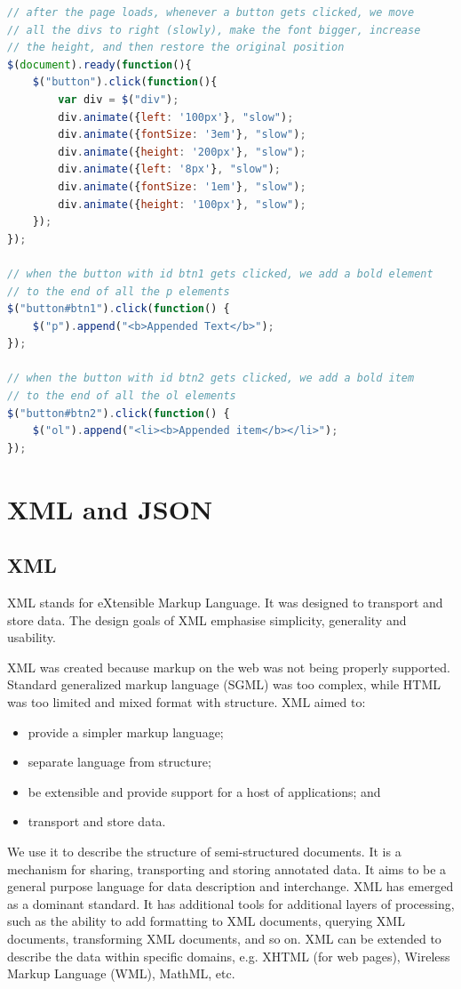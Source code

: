 \documentclass[a4paper, openany]{memoir}
\begin{document}
\begin{lstlisting}[language=javascript]
// after the page loads, whenever a button gets clicked, we move
// all the divs to right (slowly), make the font bigger, increase 
// the height, and then restore the original position
$(document).ready(function(){	
	$("button").click(function(){	
		var	div	= $("div");			
		div.animate({left: '100px'}, "slow");	
		div.animate({fontSize: '3em'}, "slow");	
		div.animate({height: '200px'}, "slow");	
		div.animate({left: '8px'}, "slow");	
		div.animate({fontSize: '1em'}, "slow");	
        div.animate({height: '100px'}, "slow");
    });	
});

// when the button with id btn1 gets clicked, we add a bold element
// to the end of all the p elements
$("button#btn1").click(function() {
    $("p").append("<b>Appended Text</b>");
});

// when the button with id btn2 gets clicked, we add a bold item
// to the end of all the ol elements
$("button#btn2").click(function() {
    $("ol").append("<li><b>Appended item</b></li>");
});
\end{lstlisting}
\newpage

\section{XML and JSON}
\subsection{XML}
XML stands for eXtensible Markup Language. It was designed to transport and store data. The design goals of XML emphasise simplicity, generality and usability.

\noindent XML was created because markup on the web was not being properly supported. Standard generalized markup language (SGML) was too complex, while HTML was too limited and mixed format with structure. XML aimed to:
\begin{itemize}
    \item provide a simpler markup language;
    \item separate language from structure;
    \item be extensible and provide support for a host of applications; and
    \item transport and store data.
\end{itemize}
We use it to describe the structure of semi-structured documents. It is a mechanism for sharing, transporting and storing annotated data. It aims to be a general purpose language for data description and interchange. XML has emerged as a dominant standard. It has additional tools for additional layers of processing, such as the ability to add formatting to XML documents, querying XML documents, transforming XML documents, and so on. XML can be extended to describe the data within specific domains, e.g. XHTML (for web pages), Wireless Markup Language (WML), MathML, etc.
\end{document}
